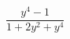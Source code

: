 \begin{ex}[type=expression]
	\begin{condition}
		\(\dfrac{y^4-1}{1+2y^2+y^4}\)
	\end{condition}
\end{ex}